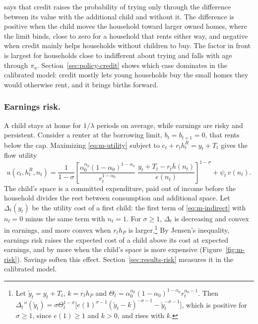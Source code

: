 says that credit raises the probability of trying only through the difference
between its value with the additional child and without it. The difference is
positive when the child moves the household toward larger owned homes, where
the limit binds, close to zero for a household that rents either way, and
negative when credit mainly helps households without children to buy. The
factor in front is largest for households close to indifferent about trying
and falls with age through $\pi_a$. Section~\ref{sec:policy-credit} shows
which case dominates in the calibrated model: credit mostly lets young
households buy the small homes they would otherwise rent, and it brings
births forward.

\subsubsection*{Earnings risk.}
A child stays at home for $1/\lambda$ periods on average, while earnings are
risky and persistent. Consider a renter at the borrowing limit,
$b_t=b_{t+1}=0$, that rents below the cap. Maximizing \eqref{eq:m-utility}
subject to $c_t+r_th^R_t=y_t+T_t$ gives the flow utility
\begin{equation}
 u(c_t,h^R_t,n_t)=\frac{1}{1-\sigma}\left[\frac{\alpha_0^{\alpha_0}(1-\alpha_0)^{1-\alpha_0}}{r_t^{1-\alpha_0}}\;
 \frac{y_t+T_t-r_t\bar h(n_t)}{e(n_t)}\right]^{1-\sigma}+\psi_t\,v(n_t).
 \label{eq:m-indirect}
\end{equation}
The child's space is a committed expenditure, paid out of income before the
household divides the rest between consumption and additional space. Let
$\Delta_t(y_t)$ be the utility cost of a first child: the first term of
\eqref{eq:m-indirect} with $n_t=0$ minus the same term with $n_t=1$. For
$\sigma\ge1$, $\Delta_t$ is decreasing and convex in earnings, and more convex
when $r_th_P$ is larger.\footnote{Let $\tilde y_t=y_t+T_t$, $k=r_th_P$ and
$\Theta_t=\alpha_0^{\alpha_0}(1-\alpha_0)^{1-\alpha_0}r_t^{\alpha_0-1}$. Then
$\Delta_t''(\tilde y_t)=\sigma\Theta_t^{1-\sigma}\bigl[e(1)^{\sigma-1}(\tilde y_t-k)^{-\sigma-1}-\tilde y_t^{-\sigma-1}\bigr]$,
which is positive for $\sigma\ge1$, since $e(1)\ge1$ and $k>0$, and rises
with $k$.} By Jensen's inequality, earnings risk raises the expected cost of a
child above its cost at expected earnings, and by more when the child's space
is more expensive (Figure~\ref{fig:m-risk}). Savings soften this effect.
Section~\ref{sec:results-risk} measures it in the calibrated model.

